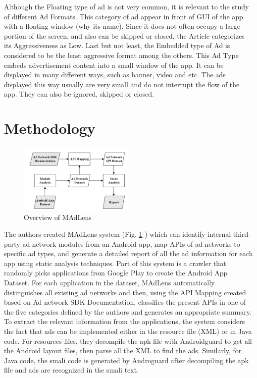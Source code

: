 \documentclass[conference]{IEEEtran}
\begin{document}
Although the Floating type of ad is not very common, it is relevant to the study of different Ad Formats. This category of ad appear in front of GUI of the app with a floating window (why its name). Since it does not often occupy a large portion of the screen, and also can be skipped or closed, the Article categorizes its Aggressiveness as Low. 
Last but not least, the Embedded type of Ad is considered to be the least aggressive format among the others. This Ad Type embeds advertisement content into a small window of the app. It can be displayed in many different ways, such as banner, video and etc. The ads displayed this way usually are very small and do not interrupt the flow of the app. They can also be ignored, skipped or closed.


\section{Methodology}
\begin{figure}[htbp]
	\includegraphics[width=0.5\textwidth,height=0.5\textheight,keepaspectratio]{system.png}
	\caption{Overview of MAdLens}
	\label{fig:system}
\end{figure}
The authors created MAdLens system (Fig. \ref{fig:system} ) which can identify internal third-party ad network modules from an Android app, map APIs of ad networks to specific ad types, and generate a detailed report of all the ad information for each app using static analysis techniques. Part of this system is a crawler that randomly picks applications from Google Play to create the Android App Dataset. For each application in the dataset, MAdLens automatically distinguishes all existing ad networks and then, using the API Mapping created based on Ad network SDK Documentation, classifies the present APIs in one of the five categories defined by the authors and generates an appropriate summary. To extract the relevant information from the applications, the system considers the fact that ads can be implemented either in the resource file (XML) or in Java code. For resources files, they decompile the apk file with Androidguard to get all the Android layout files, then parse all the XML to find the ads. Similarly, for Java code, the smali code is generated by Androguard after decompiling the apk file and ads are recognized in the smali text.
\end{document}
